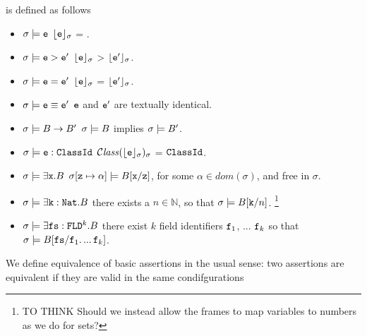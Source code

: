  \begin{definition} is defined  as follows
\label{def:valid"basic:assert}
\begin{itemize}
\item
$\sigma \models {\mbox{\tt{e}}}$ \IFF  ${\lfloor{ {\ensuremath{{\mbox{\tt{e}}}}}}\rfloor_{\sigma}}$ = .
\item
$\sigma \models {\mbox{\tt{e}}}>{\mbox{\tt{e}}}'$ \IFF ${\lfloor{ {\ensuremath{{\mbox{\tt{e}}}}}}\rfloor_{\sigma}}$ > ${\lfloor{ {\ensuremath{{\mbox{\tt{e}}}'}}}\rfloor_{\sigma}}$.
\item
$\sigma \models {\mbox{\tt{e}}}={\mbox{\tt{e}}}'$ \IFF ${\lfloor{ {\ensuremath{{\mbox{\tt{e}}}}}}\rfloor_{\sigma}}$ = ${\lfloor{ {\ensuremath{{\mbox{\tt{e}}}'}}}\rfloor_{\sigma}}$.
\item
$\sigma \models {\mbox{\tt{e}}}\equiv{\mbox{\tt{e}}}'$ \IFF ${\mbox{\tt{e}}}$ and ${\mbox{\tt{e}}}'$ are textually identical.
\item
$\sigma \models B \rightarrow B' $ \IFF $\sigma \models B$ implies $\sigma \models B'$. 
\item
$\sigma \models  {\mbox{\tt{e}}}:{\mbox{\tt{ClassId}}}$ \IFF ${\mathcal C}{\mathit{lass}}({\lfloor{ {\ensuremath{{\mbox{\tt{e}}}}}}\rfloor_{\sigma}})_{\sigma}$ = ${\mbox{\tt{ClassId}}}$.
\item
$\sigma \models  \exists {\mbox{\tt{x}}}.B$ \IFF %
$\sigma[{\mbox{\tt{z}}}\mapsto \alpha] \models  B[{\mbox{\tt{x}}}/{\mbox{\tt{z}}}]$, for some $\alpha\in dom(\sigma)$,  and   free in $\sigma$.
\item
$\sigma \models  \exists {\mbox{\tt{k}}}:{\mbox{\tt{Nat}}}.B$ \IFF  there exists a $n\in\mathbb{N}$, so that   $\sigma \models    B[{\mbox{\tt{k}}}/n]$. 
\footnote{TO THINK Should we instead allow the frames to map variables to numbers as we do for sets?}
\item
$\sigma \models  \exists {\mbox{\tt{fs}}}:{\mbox{\tt{FLD}}}^k.B$ \IFF  there exist $k$ field identifiers ${\mbox{\tt{f}}}_1$, ... ${\mbox{\tt{f}}}_k$ so that 
$\sigma \models  B[{\mbox{\tt{fs}}}/{\mbox{\tt{f}}}_1.\,...\,{\mbox{\tt{f}}}_k]$. 
\end{itemize}
\end{definition}

We define equivalence of basic assertions in the usual sense: two assertions are equivalent if they are valid in the same condifgurations

